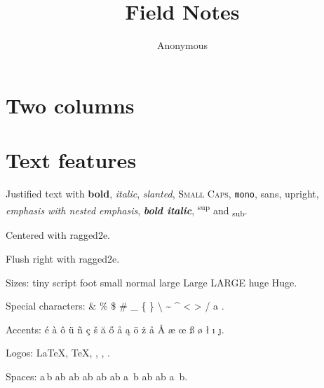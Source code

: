 \documentclass[a4paper,11pt]{article}
\begin{document}
\title{Field Notes}
\author{Anonymous}
\maketitle
\thispagestyle{empty}

\begin{abstract}
\lipsum[1][1-3]
\end{abstract}

\section{Two columns}
\begin{multicols}{2}
\lipsum[2]
\columnbreak
\lipsum[3]
\end{multicols}

\section{Text features}
\begin{justify}
Justified text with \textbf{bold}, \textit{italic}, \textsl{slanted}, \textsc{Small Caps}, \texttt{mono}, \textsf{sans},
\textup{upright}, \emph{emphasis with \emph{nested} emphasis}, \textbf{\textit{bold italic}},
\textsuperscript{sup} and \textsubscript{sub}.
\end{justify}
\begin{Center}
Centered with ragged2e.
\end{Center}
\begin{FlushRight}
Flush right with ragged2e.
\end{FlushRight}

Sizes: {\tiny tiny} {\scriptsize script} {\footnotesize foot} {\small small} {\normalsize normal} {\large large} {\Large Large} {\LARGE LARGE} {\huge huge} {\Huge Huge}.

Special characters: \& \% \$ \# \_ \{ \} \textbackslash{} \textasciitilde{} \textasciicircum{} \textless{} \textgreater{} \textbar{} \slash{} \textperiodcentered{} \textbullet{} \dag{} \ddag{} \textdagger{} \textsection{} \textquotedbl{} \guillemotleft{}a\guillemotright{} \textendash{} \textemdash{} \textellipsis{}.

Accents: \'e \`a \^o \"u \~n \c{c} \v{s} \u{a} \H{o} \r{a} \k{a} \={o} \.{z} \aa{} \AA{} \ae{} \oe{} \ss{} \o{} \l{} \i{} \j{}.

Logos: \LaTeX{}, \TeX{}, \LaTeXe{}, \BibTeX{}, \XeLaTeX{}.

Spaces: a\,b a\:b a\;b a\!b a\quad b a\qquad b a~b a\enspace b a\thinspace b a\ b.
\end{document}
